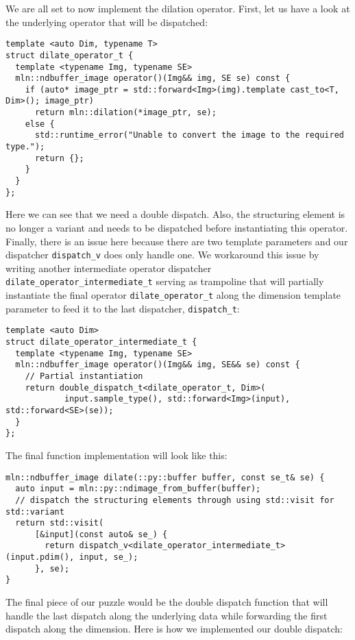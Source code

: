 We are all set to now implement the dilation operator. First, let us have a look at the underlying operator that will be
dispatched:

\begin{verbatim}
template <auto Dim, typename T>
struct dilate_operator_t {
  template <typename Img, typename SE>
  mln::ndbuffer_image operator()(Img&& img, SE se) const {
    if (auto* image_ptr = std::forward<Img>(img).template cast_to<T, Dim>(); image_ptr)
      return mln::dilation(*image_ptr, se);
    else {
      std::runtime_error("Unable to convert the image to the required type.");
      return {};
    }
  }
};
\end{verbatim}

Here we can see that we need a double dispatch. Also, the structuring element is no longer a variant and needs to be
dispatched before instantiating this operator. Finally, there is an issue here because there are two template parameters
and our dispatcher \texttt{dispatch\_v} does only handle one. We workaround this issue by writing another intermediate
operator dispatcher \texttt{dilate\_operator\_intermediate\_t} serving as trampoline that will partially instantiate the
final operator \texttt{dilate\_operator\_t} along the dimension template parameter to feed it to the last dispatcher,
\texttt{dispatch\_t}:

\begin{verbatim}
template <auto Dim>
struct dilate_operator_intermediate_t {
  template <typename Img, typename SE>
  mln::ndbuffer_image operator()(Img&& img, SE&& se) const {
    // Partial instantiation
    return double_dispatch_t<dilate_operator_t, Dim>(
            input.sample_type(), std::forward<Img>(input), std::forward<SE>(se));
  }
};
\end{verbatim}

The final function implementation will look like this:

\begin{verbatim}
mln::ndbuffer_image dilate(::py::buffer buffer, const se_t& se) {
  auto input = mln::py::ndimage_from_buffer(buffer);
  // dispatch the structuring elements through using std::visit for std::variant 
  return std::visit(
      [&input](const auto& se_) {
        return dispatch_v<dilate_operator_intermediate_t>(input.pdim(), input, se_);
      }, se);
}
\end{verbatim}

The final piece of our puzzle would be the double dispatch function that will handle the last dispatch along the
underlying data while forwarding the first dispatch along the dimension. Here is how we implemented our double dispatch:

